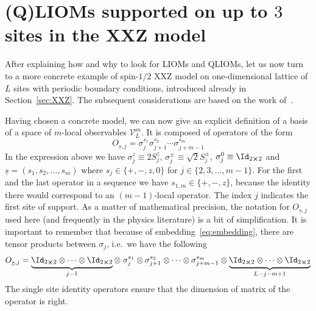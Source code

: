 
\section{(Q)LIOMs supported on up to \(3\) sites in the XXZ model\label{sec:example}}

After explaining how and why to look for LIOMs and QLIOMs, let us now turn to a more concrete
example of spin-\(1/2\) XXZ model on one-dimensional lattice of \(L\) sites with periodic
boundary conditions, introduced already in Section~\ref{sec:XXZ}. The subsequent
considerations are based on the work of~\textcite{Mierzejewski2015a}.

Having chosen a concrete model, we can now give an explicit definition of a basis
of a space of \(m\)-local observables \(\mathcal{V}_L^m\). It is composed of operators
of the form
\begin{equation}
  O_{\underline{s},j}=\sigma_{j}^{s_{1}} \sigma_{j+1}^{s_{2}} \cdots 
  \sigma_{j+m-1}^{s_{m}}
  \label{eq:basis operator}
\end{equation}
In the expression above we have \(\sigma_j^z \equiv 2 S^z_j\),
\(\sigma_j^{\pm} \equiv \sqrt{2} S_j^{\pm}\), \(\sigma^{0}_j \equiv \Id_{2\cross 2}\) and
 \(\underline{s} = \left(s_1, s_2,\ldots, s_m\right)\) where \(s_j \in \{+,-,z,0\}\) for
 \(j \in \{2,3,\ldots,m-1\}\). For the first and the last operator in a sequence we have 
 \(s_{1,m} \in \{+,-,z\}\), because the identity there would correspond to an \((m-1)\)-local
 operator. The index \(j\) indicates the first site of support.
As a matter of mathematical precision, the notation for \(O_{\underline{s},j}\) used here 
(and frequently in the physics literature) is a bit of simplification. It is important to remember
that because of embedding~\eqref{eq:embedding}, there are tensor products between \(\sigma_j\), i.e.\ we have the following
\begin{equation}
  O_{\underline{s},j}= \underbrace{\Id_{2\cross 2} \otimes \cdots
       \otimes \Id_{2\cross 2}}_{j-1} \otimes \; \sigma_{j}^{s_{1}} \otimes \sigma_{j+1}^{s_{2}} \otimes
        \cdots \otimes \sigma_{j+m-1}^{s_{m}} \otimes 
        \underbrace{\Id_{2\cross 2} \otimes \cdots \otimes \Id_{2\cross 2}}_{L-j-m+1}
        \label{eq:basis with tensors}
\end{equation}
The single site identity operators ensure that the dimension of matrix of the operator is right.
